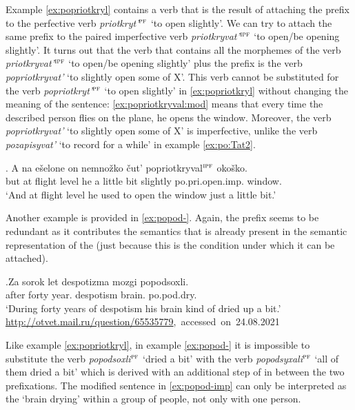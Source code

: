 Example \ref{ex:popriotkryl} contains a verb that is the result of attaching the  prefix  to the perfective verb \textit{priotkryt'}$^{\textsc{pf}}$ `to open slightly'. We can try to attach the same prefix to the paired imperfective verb \textit{priotkryvat'}$^{\textsc{ipf}}$ `to open/be opening slightly'. It turns out that the verb that contains all the morphemes of the verb \textit{priotkryvat'}$^{\textsc{ipf}}$ `to open/be opening slightly' plus the prefix  is the verb \textit{popriotkryvat'} `to slightly open some of X'. This verb cannot be substituted for the verb \textit{popriotkryt'}$^{\textsc{pf}}$ `to open slightly' in \ref{ex:popriotkryl} without changing the meaning of the sentence: \ref{ex:popriotkryval:mod} means that every time the described person flies on the plane, he opens the window. Moreover, the verb \textit{popriotkryvat'} `to slightly open some of X' is imperfective, unlike the verb \textit{pozapisyvat'} `to record for a while' in example \ref{ex:po:Tat2}.

\exg. \label{ex:popriotkryval:mod}A na e\v{s}elone on nemno\v{z}ko \v{c}ut' popriotkryval$^{\textsc{ipf}}$ oko\v{s}ko.\\
but at {flight level} he {a little bit} {slightly} po.pri.open.imp. window.\\
\trans `And at flight level he used to open the window just a little bit.'

Another example is provided in \ref{ex:popod-}. Again, the  prefix  seems to be redundant as it contributes the  semantics that is already present in the semantic representation of the  (just because this is the condition under which it can be attached).

\exg.\label{ex:popod-}Za sorok let despotizma mozgi popodsoxli.\\
after forty year. despotism brain. po.pod.dry.\\
\trans `During forty years of despotism his brain kind of dried up a bit.'\\\hbox{}\hfill\hbox{\url{http://otvet.mail.ru/question/65535779}, accessed on 24.08.2021}

Like example \ref{ex:popriotkryl}, in example \ref{ex:popod-} it is impossible to substitute the verb \textit{popodsoxli}$^{\textsc{pf}}$ `dried a bit' with the verb \textit{popodsyxali}$^{\textsc{pf}}$ `all of them dried a bit' which is derived with an additional step of  in between the two prefixations. The modified sentence in \ref{ex:popod-imp} can only be interpreted as the `brain drying' within a group of people, not only with one person.  

